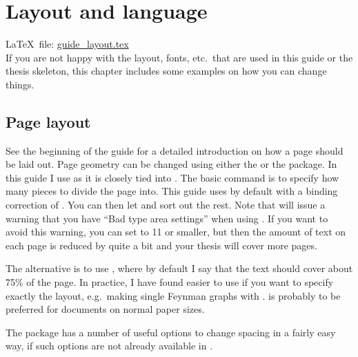
\chapter{Layout and language}%
\label{sec:layout}

\LaTeX\ file: \href{run:./guide_layout.tex}{guide\_layout.tex}\\[1ex]
\noindent
If you are not happy with the layout, fonts, etc.\ that are used in
this guide or the thesis skeleton, this chapter includes some examples
on how you can change things.


\section{Page layout}%
\label{sec:layout:page}


See the beginning of the \KOMAScript{} guide for a detailed
introduction on how a page should be laid out.
Page geometry can be changed using either the  or
the  package. In this guide I use 
as it is closely tied into \KOMAScript. The basic command is to
specify how many pieces to divide the page into. This guide uses
 by default with a binding correction of
.  You can then let \KOMAScript{} and
 sort out the rest. Note that 
will issue a warning that you have \enquote{Bad type area settings}
when using . If you want to avoid this warning, you can
set  to 11 or smaller, but then the amount of text on each
page is reduced by quite a bit and your thesis will cover more pages.

The alternative is to use , where by default I say
that the text should cover about 75\% of the page. In practice, I have
found  easier to use if you want to specify exactly
the layout, e.g.\ making single Feynman graphs with
.  is probably to be preferred for
documents on normal paper sizes.

The  package has a number of useful options to change
spacing in a fairly easy way, if such options are not already
available in \KOMAScript.

